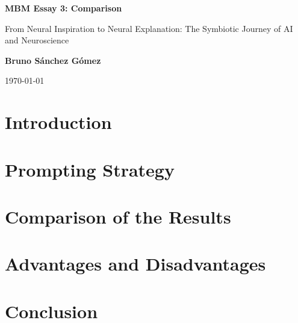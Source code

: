 \documentclass[11pt,a4paper]{article}
\author{Bruno Sánchez Gómez}
\date{\today}
\begin{document}
\begin{titlepage}
    \centering
    \vspace*{2cm}
    {\Huge \bfseries MBM Essay 3: Comparison \par}
    \vspace{2cm}
    {\huge From Neural Inspiration to Neural Explanation: The Symbiotic Journey of AI and Neuroscience \par}
    \vspace{10cm}
    {\large \textbf{Bruno Sánchez Gómez} \par}
    \vfill
    {\large \today \par}
\end{titlepage}

\section{Introduction}



\section{Prompting Strategy}



\section{Comparison of the Results}



\section{Advantages and Disadvantages}


\section{Conclusion}



\clearpage
\nocite{*}
\printbibliography%
\end{document}

